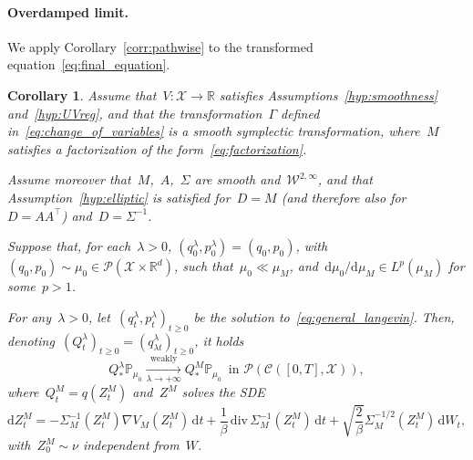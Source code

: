 \documentclass[10pt]{article}
\renewcommand{\d}{\mathrm{d}}
\renewcommand{\P}{\mathbb{P}}
\newcommand{\R}{\mathbb{R}}
\newcommand{\cX}{\mathcal{X}}
\newcommand{\cP}{\mathcal{P}}
\newcommand{\1}{\mathbbm 1}
\newcommand{\cW}{\mathcal{W}}
\newtheorem{corollary}{Corollary}
\begin{document}
\paragraph{Overdamped limit.}
We apply Corollary~\ref{corr:pathwise} to the transformed equation~\eqref{eq:final_equation}.
\begin{corollary}
    \label{thm:overdamped_mass_matrix}
    Assume that~$V:\cX\to\R$ satisfies Assumptions~\ref{hyp:smoothness} and~\ref{hyp:UVreg}, and that the transformation~$\Gamma$ defined in~\eqref{eq:change_of_variables} is a smooth symplectic transformation, where~$M$ satisfies a factorization of the form~\eqref{eq:factorization}.
    
    Assume moreover that~$M$,~$A$,~$\Sigma$ are smooth and~$\cW^{2,\infty}$, and that Assumption~\ref{hyp:elliptic} is satisfied for~$D=M$ (and therefore also for~$D=AA^\top$) and~$D=\Sigma^{-1}$.
    
    Suppose that, for each~$\lambda>0$, $(q_0^\lambda,p_0^\lambda)=(q_0,p_0)$, with~$(q_0,p_0)\sim \mu_{0}\in\cP(\cX\times\R^d)$, such that~$\mu_{0}\ll \mu_M$, and~$\d\mu_{0}/\d \mu_M\in L^p(\mu_{M})$ for some~$p>1$.
    
    
    For any~$\lambda>0$, let~$(q_t^\lambda,p_t^\lambda)_{t\geq 0}$ be the solution to~\eqref{eq:general_langevin}. Then, denoting~$(Q_t^\lambda)_{t\geq 0}=(q_{\lambda t}^\lambda)_{t\geq 0}$, it holds
    \begin{equation}
        Q^\lambda_*\P_{\mu_0} \xrightarrow[\lambda\to +\infty]{\text{weakly}} Q^M_*\P_{\mu_0}\,\text{ in }\cP(\mathcal C([0,T],\cX)),
    \end{equation}
    where~$Q^M_t = q(Z^M_t)$ and~$Z^M$ solves the SDE
    \begin{equation}
        \label{eq:od_mass}
        \d Z_t^M = -\Sigma_M^{-1}(Z_t^M)\nabla V_M(Z_t^M)\,\d t + \frac1\beta \,\mathrm{div}\,\Sigma_M^{-1}(Z_t^M)\,\d t + \sqrt{\frac{2}\beta}\Sigma_{M}^{-1/2}(Z_t^M)\,\d W_t,
    \end{equation}
    with~$Z_0^M\sim\nu$ independent from~$W$.
\end{corollary}
\end{document}
